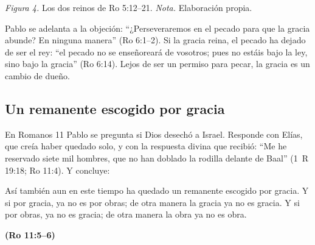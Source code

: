 \documentclass[11pt,letterpaper]{article}
\newcommand{\fuente}[1]{\par\hfill{\upshape\bfseries\small\textcolor{azul}{#1}}}
\begin{document}
\begin{center}
\par
{\footnotesize\color{gris}\textit{Figura 4.} Los dos reinos de Ro 5:12--21. \textit{Nota.} Elaboración propia.}
\end{center}

Pablo se adelanta a la objeción: ``¿Perseveraremos en el pecado para que la gracia abunde? En ninguna manera'' (Ro 6:1--2). Si la gracia reina, el pecado ha dejado de ser el rey: ``el pecado no se enseñoreará de vosotros; pues no estáis bajo la ley, sino bajo la gracia'' (Ro 6:14). Lejos de ser un permiso para pecar, la gracia es un cambio de dueño.

\subsection{Un remanente escogido por gracia}
En Romanos 11 Pablo se pregunta si Dios desechó a Israel. Responde con Elías, que creía haber quedado solo, y con la respuesta divina que recibió: ``Me he reservado siete mil hombres, que no han doblado la rodilla delante de Baal'' (1~R 19:18; Ro 11:4). Y concluye:

\begin{cita}Así también aun en este tiempo ha quedado un remanente escogido por gracia. Y si por gracia, ya no es por obras; de otra manera la gracia ya no es gracia. Y si por obras, ya no es gracia; de otra manera la obra ya no es obra.\fuente{(Ro 11:5--6)}\end{cita}
\end{document}
